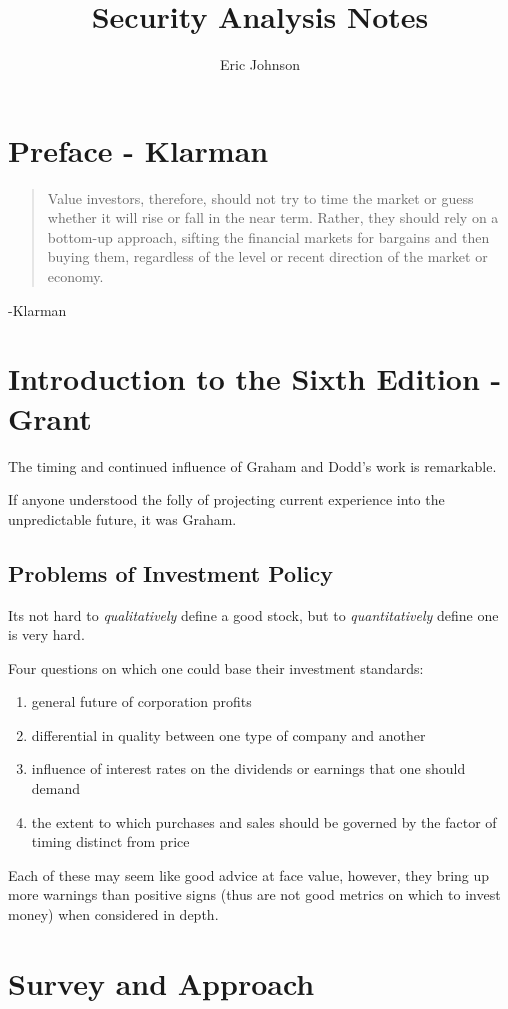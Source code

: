 \documentclass{article}
\title{Security Analysis Notes}
\author{Eric Johnson}
\begin{document}
\maketitle
\section*{Preface - Klarman}
\begin{quote}
Value investors, therefore, should not try to time the market or guess whether it will rise or fall in the near term. Rather, they should rely on a bottom-up approach, sifting the financial markets for bargains and then buying them, regardless of the level or recent direction of the market or economy.
\end{quote}
-Klarman
\section*{Introduction to the Sixth Edition - Grant}
The timing and continued influence of Graham and Dodd's work is remarkable. 
\par
If anyone understood the folly of projecting current experience into the unpredictable future, it was Graham.
\subsection*{Problems of Investment Policy}
Its not hard to \textit{qualitatively} define a good stock, but to \textit{quantitatively} define one is very hard.
\par
Four questions on which one could base their investment standards:
\begin{enumerate}
\item general future of corporation profits
\item differential in quality between one type of company and another
\item influence of interest rates on the dividends or earnings that one should demand
\item the extent to which purchases and sales should be governed by the factor of timing distinct from price
\end{enumerate}
Each of these may seem like good advice at face value, however, they bring up more warnings than positive signs (thus are not good metrics on which to invest money) when considered in depth.

\section{Survey and Approach}
\end{document}
